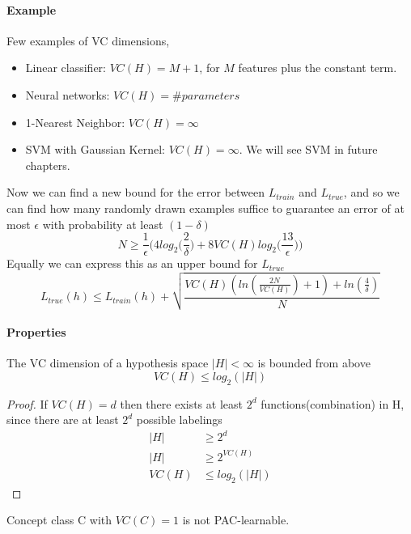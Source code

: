 \documentclass[../main.tex]{subfiles}
\begin{document}
\paragraph{Example} Few examples of VC dimensions,
\begin{itemize}
    \item Linear classifier: $VC(H) = M+1$, for $M$ features plus the constant term.
    \item Neural networks: $VC(H) = \#parameters$
    \item 1-Nearest Neighbor: $VC(H) = \infty$
    \item SVM with Gaussian Kernel: $VC(H) = \infty$. We will see SVM in future chapters.
\end{itemize}
Now we can find a new bound for the error between $L_{train}$ and $L_{true}$, and so we can find how many randomly drawn examples suffice to guarantee an error of at most $\epsilon$ with probability at least $(1-\delta)$
\begin{equation}
    N \geq \frac{1}{\epsilon} \bigg( 4log_2 \bigg( \frac{2}{\delta} \bigg) + 8VC(H) log_2 \bigg( \frac{13}{\epsilon} \bigg) \bigg)
\end{equation}
Equally we can express this as an upper bound for $L_{true}$
\begin{equation}
    L_{true}(h) \leq L_{train}(h) + \sqrt{\frac{VC(H)(ln(\frac{2N}{VC(H)})+1)+ln(\frac{4}{\delta})}{N}}
\end{equation}

\paragraph{Properties}
\begin{theorem}
    The VC dimension of a hypothesis space $|H| < \infty$ is bounded from above
    \begin{equation*}
        VC(H) \leq log_2(|H|)
    \end{equation*}
\end{theorem}
\begin{proof}
    If $VC(H)=d$ then there exists at least $2^d$ functions(combination) in H, since there are at least $2^d$ possible labelings
    \begin{align*}
        |H|   & \geq 2^d        \\
        |H|   & \geq 2^{VC(H)}  \\
        VC(H) & \leq log_2(|H|)
    \end{align*}
\end{proof}
\begin{theorem}
    Concept class C with $VC(C) = 1$ is not PAC-learnable.
\end{theorem}

\newpage
\end{document}
